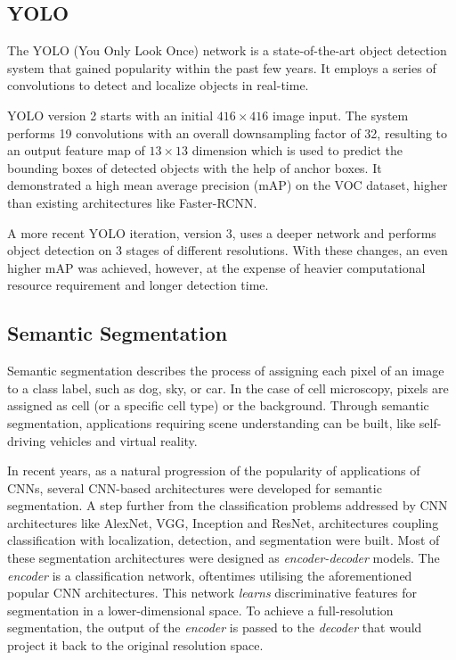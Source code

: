 \documentclass[10pt, journal, compsoc]{IEEEtran}
\begin{document}
\subsection{YOLO}
The YOLO (You Only Look Once) network\cite{redmon2016yolo9000} is a state-of-the-art object detection system that gained popularity within the past few years. It employs a series of convolutions to detect and localize objects in real-time.

YOLO version 2 starts with an initial $416\times 416$ image input. The system performs 19 convolutions with an overall downsampling factor of 32, resulting to an output feature map of $13\times 13$ dimension which is used to predict the bounding boxes of detected objects with the help of anchor boxes. It demonstrated a high mean average precision (mAP) on the VOC dataset, higher than existing architectures like Faster-RCNN.

A more recent YOLO iteration, version 3\cite{yolov3}, uses a deeper network and performs object detection on 3 stages of different resolutions. With these changes, an even higher mAP was achieved, however, at the expense of heavier computational resource requirement and longer detection time.
\subsection{Semantic Segmentation}
Semantic segmentation describes the process of assigning each pixel of an image to a class label, such as dog, sky, or car. In the case of cell microscopy, pixels are assigned as cell (or a specific cell type) or the background. Through semantic segmentation, applications requiring scene understanding can be built, like self-driving vehicles and virtual reality. 

In recent years, as a natural progression of the popularity of applications of CNNs, several CNN-based architectures were developed for semantic segmentation. A step further from the classification problems addressed by CNN architectures like AlexNet, VGG, Inception and ResNet, architectures coupling classification with localization, detection, and segmentation were built. Most of these segmentation architectures were designed as \textit{encoder-decoder} models. The \textit{encoder} is a classification network, oftentimes utilising the aforementioned popular CNN architectures. This network \textit{learns} discriminative features for segmentation in a lower-dimensional space. To achieve a full-resolution segmentation, the output of the \textit{encoder} is passed to the \textit{decoder} that would project it back to the original resolution space.
\end{document}
